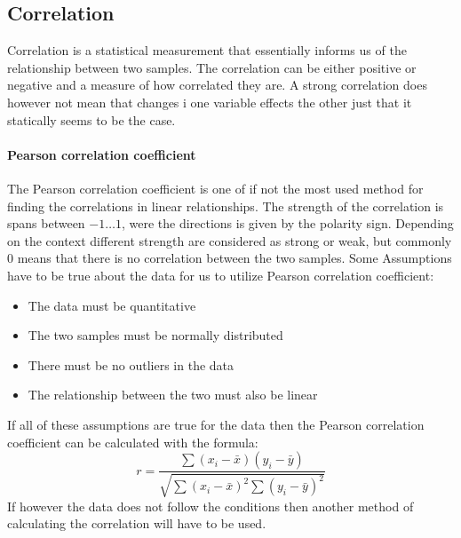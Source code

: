 \subsection{Correlation}
Correlation is a statistical measurement that essentially informs us of the relationship between two samples. The correlation can be either positive or negative and a measure of how correlated they are. A strong correlation does however not mean that changes i one variable effects the other just that it statically seems to be the case.
\paragraph{Pearson correlation coefficient} The Pearson correlation coefficient is one of if not the most used method for finding the correlations in linear relationships. The strength of the correlation is spans between $-1 \dotsc 1$, were the directions is given by the polarity sign. Depending on the context different strength are considered as strong or weak, but commonly 0 means that there is no correlation between the two samples. Some Assumptions have to be true about the data for us to utilize Pearson correlation coefficient:
\begin{itemize}
    \item The data must be quantitative
    \item The two samples must be normally distributed
    \item There must be no outliers in the data
    \item The relationship between the two must also be linear
\end{itemize}
If all of these assumptions are true for the data then the Pearson correlation coefficient can be calculated with the formula:
$$r=\frac{\sum{(x_i-\bar{x})(y_i-\bar{y})}}{\sqrt{\sum{(x_i-\bar{x})^2}\sum{(y_i-\bar{y})^2}}}$$
If however the data does not follow the conditions then another method of calculating the correlation will have to be used. 
